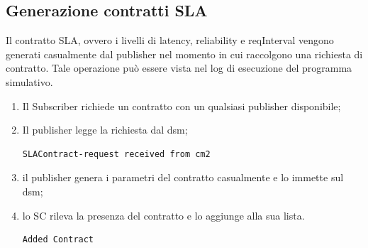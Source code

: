 \subsection{Generazione contratti SLA}
Il contratto SLA, ovvero i livelli di latency, reliability e reqInterval vengono generati casualmente dal publisher nel momento in cui raccolgono una richiesta di contratto. Tale operazione può essere vista nel log di esecuzione del programma simulativo.
\begin{enumerate}
\item Il Subscriber richiede un contratto con un qualsiasi publisher disponibile;
\item Il publisher legge la richiesta dal dsm;
\begin{center}
\begin{verbatim}
SLAContract-request received from cm2
\end{verbatim}
\end{center}
\item il publisher genera i parametri del contratto casualmente e lo immette sul dsm;
\item lo SC rileva la presenza del contratto e lo aggiunge alla sua lista.
\begin{center}
\begin{verbatim}
Added Contract
\end{verbatim}
\end{center}
\end{enumerate}
